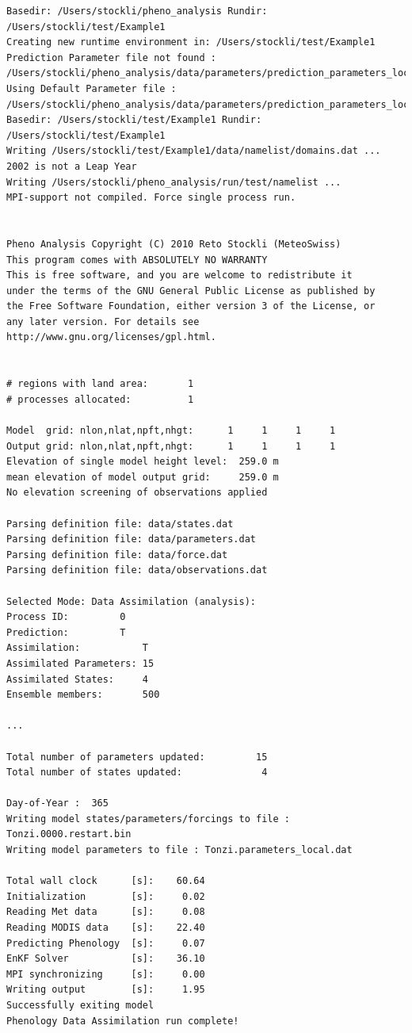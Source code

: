 \documentclass[a4paper,12pt]{article}
\begin{document}
\begin{verbatim}
Basedir: /Users/stockli/pheno_analysis Rundir: /Users/stockli/test/Example1 
Creating new runtime environment in: /Users/stockli/test/Example1 
Prediction Parameter file not found : 
/Users/stockli/pheno_analysis/data/parameters/prediction_parameters_local_Example1.dat 
Using Default Parameter file : 
/Users/stockli/pheno_analysis/data/parameters/prediction_parameters_local.dat 
Basedir: /Users/stockli/test/Example1 Rundir: /Users/stockli/test/Example1 
Writing /Users/stockli/test/Example1/data/namelist/domains.dat ...
2002 is not a Leap Year 
Writing /Users/stockli/pheno_analysis/run/test/namelist ...
MPI-support not compiled. Force single process run.


Pheno Analysis Copyright (C) 2010 Reto Stockli (MeteoSwiss)
This program comes with ABSOLUTELY NO WARRANTY
This is free software, and you are welcome to redistribute it
under the terms of the GNU General Public License as published by
the Free Software Foundation, either version 3 of the License, or
any later version. For details see http://www.gnu.org/licenses/gpl.html.


# regions with land area:       1
# processes allocated:          1

Model  grid: nlon,nlat,npft,nhgt:      1     1     1     1
Output grid: nlon,nlat,npft,nhgt:      1     1     1     1
Elevation of single model height level:  259.0 m
mean elevation of model output grid:     259.0 m
No elevation screening of observations applied

Parsing definition file: data/states.dat
Parsing definition file: data/parameters.dat
Parsing definition file: data/force.dat
Parsing definition file: data/observations.dat

Selected Mode: Data Assimilation (analysis):
Process ID:			0
Prediction:			T
Assimilation:			T
Assimilated Parameters:	15
Assimilated States:		4
Ensemble members:		500

...

Total number of parameters updated:         15
Total number of states updated:              4

Day-of-Year :  365
Writing model states/parameters/forcings to file : Tonzi.0000.restart.bin
Writing model parameters to file : Tonzi.parameters_local.dat

Total wall clock      [s]:    60.64
Initialization        [s]:     0.02
Reading Met data      [s]:     0.08
Reading MODIS data    [s]:    22.40
Predicting Phenology  [s]:     0.07
EnKF Solver           [s]:    36.10
MPI synchronizing     [s]:     0.00
Writing output        [s]:     1.95
Successfully exiting model
Phenology Data Assimilation run complete!

\end{verbatim}
\end{document}
